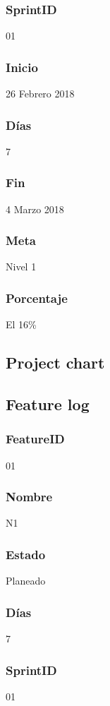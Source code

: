 \subsubsection{SprintID}
01
\subsubsection{Inicio}
26 Febrero 2018
\subsubsection{Días}
7
\subsubsection{Fin}
4 Marzo 2018
\subsubsection{Meta}
Nivel 1
\subsubsection{Porcentaje}
El 16\% 


\subsection{Project chart}



\subsection{Feature log}

\subsubsection{FeatureID}
01
\subsubsection{Nombre}
N1
\subsubsection{Estado}
Planeado
\subsubsection{Días}
7
\subsubsection{SprintID}
01
